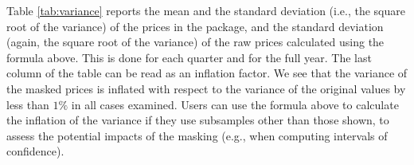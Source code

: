\documentclass[Royal,times,sageh]{sagej}
\begin{document}
Table \ref{tab:variance} reports the mean and the standard deviation
(i.e., the square root of the variance) of the prices in the package,
and the standard deviation (again, the square root of the variance) of
the raw prices calculated using the formula above. This is done for each
quarter and for the full year. The last column of the table can be read
as an inflation factor. We see that the variance of the masked prices is
inflated with respect to the variance of the original values by less
than \(1\%\) in all cases examined. Users can use the formula above to
calculate the inflation of the variance if they use subsamples other
than those shown, to assess the potential impacts of the masking (e.g.,
when computing intervals of confidence).

\begin{table}


\end{table}
\end{document}
